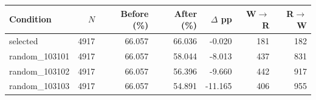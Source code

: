 \begin{tabular}{lrrrrrr}
\hline
Condition & $N$ & Before (\%) & After (\%) & $\Delta$ pp & W$\to$R & R$\to$W \\
\hline
selected & 4917 & 66.057 & 66.036 & -0.020 & 181 & 182 \\
random\_103101 & 4917 & 66.057 & 58.044 & -8.013 & 437 & 831 \\
random\_103102 & 4917 & 66.057 & 56.396 & -9.660 & 442 & 917 \\
random\_103103 & 4917 & 66.057 & 54.891 & -11.165 & 406 & 955 \\
\hline
\end{tabular}
